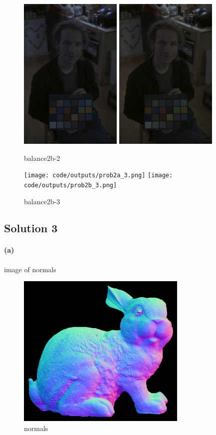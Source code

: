 \documentclass{article}
\newcommand{\solution}[1]{\clearpage \subsection*{Solution #1}}  %
\newcommand{\spart}[1]{\paragraph{(#1)}}
\begin{document}
\begin{figure}[h!]
  \centering
  	\includegraphics[height=20em]{code/outputs/prob2a_2.png}
	\includegraphics[height=20em]{code/outputs/prob2b_2.png}
	  \caption{balance2b-2}
\end{figure}

\begin{figure}[h!]
  \centering
  	\texttt{[image: code/outputs/prob2a\_3.png]}
	\texttt{[image: code/outputs/prob2b\_3.png]}
	  \caption{balance2b-3}
\end{figure}

\solution{3}
\spart{a}
image of normals
\begin{figure}[h!]
  \centering
  	\includegraphics[height=20em]{code/outputs/prob3_nrm.png}
	  \caption{normals}
\end{figure}
\end{document}
